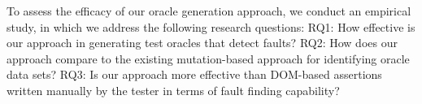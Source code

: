 To assess the efficacy of our oracle generation approach, we conduct an empirical study, in
which we address the following research questions:
RQ1: How effective is our approach in generating test oracles that detect faults?
RQ2: How does our approach compare to the existing mutation-based approach for identifying
oracle data sets?
RQ3: Is our approach more effective than DOM-based assertions written manually by the tester
in terms of fault finding capability?